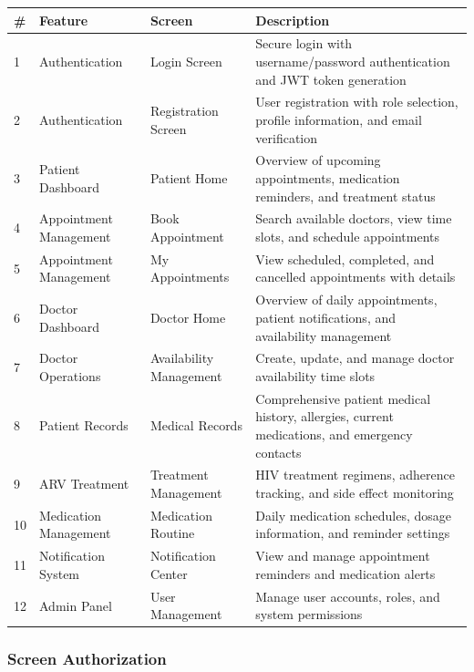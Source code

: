 \documentclass[12pt,a4paper]{article}
\begin{document}
\begin{longtable}{|p{1cm}|p{3cm}|p{3cm}|p{7cm}|}
\hline
\textbf{\#} & \textbf{Feature} & \textbf{Screen} & \textbf{Description} \\
\hline
1 & Authentication & Login Screen & Secure login with username/password authentication and JWT token generation \\
\hline
2 & Authentication & Registration Screen & User registration with role selection, profile information, and email verification \\
\hline
3 & Patient Dashboard & Patient Home & Overview of upcoming appointments, medication reminders, and treatment status \\
\hline
4 & Appointment Management & Book Appointment & Search available doctors, view time slots, and schedule appointments \\
\hline
5 & Appointment Management & My Appointments & View scheduled, completed, and cancelled appointments with details \\
\hline
6 & Doctor Dashboard & Doctor Home & Overview of daily appointments, patient notifications, and availability management \\
\hline
7 & Doctor Operations & Availability Management & Create, update, and manage doctor availability time slots \\
\hline
8 & Patient Records & Medical Records & Comprehensive patient medical history, allergies, current medications, and emergency contacts \\
\hline
9 & ARV Treatment & Treatment Management & HIV treatment regimens, adherence tracking, and side effect monitoring \\
\hline
10 & Medication Management & Medication Routine & Daily medication schedules, dosage information, and reminder settings \\
\hline
11 & Notification System & Notification Center & View and manage appointment reminders and medication alerts \\
\hline
12 & Admin Panel & User Management & Manage user accounts, roles, and system permissions \\
\hline
\end{longtable}

\subsubsection{Screen Authorization}
\end{document}

